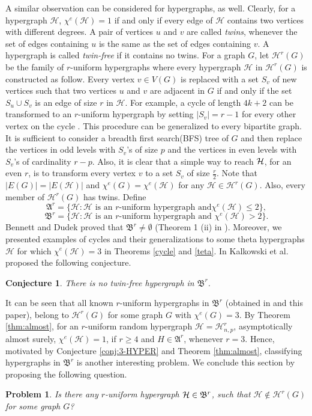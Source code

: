 \documentclass[12pt,a4paper]{article}
\newtheorem{conjecture}{\bf Conjecture}
\newtheorem{problem}[theorem]{Problem}
\begin{document}
A similar observation can be considered for hypergraphs, as well.
Clearly, for a hypergraph $ \mathcal{H} $, $ \chi^e(\mathcal{H})=1 $ if and only if every edge of $\mathcal{H}$ contains two vertices with different degrees.
A pair of vertices $ u $ and $ v $ are called \textit{twins}, whenever the set
of edges containing $ u $ is the same as the set of edges containing $ v $.
A hypergraph is called \textit{twin-free} if it contains no twins. For a graph $ G $, let $ \mathcal{H}^r(G) $ be the family of $r$-uniform  hypergraphs where every hypergraph  $\mathcal{H}$ in  $\mathcal{H}^r(G) $ is constructed  as follow. Every vertex  $v \in V( G) $ is replaced with a set $S_v$ of new vertices such that two  vertices $u$ and $v$ are adjacent in $ G $ if and only if the set $S_u \cup S_v$ is an edge of size $r$ in $\mathcal{H}$.
For example, a cycle of length $4k+2$ can be transformed  to an $r$-uniform hypergraph by setting $ |S_v|=r-1 $ for every other vertex on the cycle \cite{BDFL}.
This procedure can be generalized to every bipartite graph. It is sufficient to consider a breadth first search(BFS) tree of $G$ and then replace the vertices in odd levels with $ S_v $'s of size $p$ and   the vertices in even levels with $ S_v $'s of cardinality $r-p$. Also, it is clear that a simple way to reach $ \cal H $, for an even $ r $,  is to transform every vertex $ v $ to a set $ S_v $ of size $ \frac{r}{2} $.
Note that $|E(G)|=|E( \mathcal{H})|$ and $ \chi^{e}(G)=  \chi^{e}( \mathcal{H})$ for any $\mathcal{H}\in \mathcal{H}^r(G) $. Also, every member of $ \mathcal{H}^r(G) $ has twins.
Define
$$ \mathfrak{A}^r=\{\mathcal{H} : \mathcal{H}  \text{ is an } r\text{-uniform hypergraph and}  \chi^{e}(\mathcal{H})\leq 2 \}, $$
$$  \mathfrak{B}^r=\{\mathcal{H} : \mathcal{H}  \text{ is an } r\text{-uniform hypergraph and }  \chi^{e}(\mathcal{H})> 2 \}. $$
Bennett and Dudek proved that $  \mathfrak{B}^r \neq\emptyset $ (Theorem 1 (ii) in \cite{BDFL}). Moreover, we presented  examples of cycles and their generalizations to some theta hypergraphs $\mathcal{H}$ for  which $ \chi^e(\mathcal{H})=3 $ in Theorems \ref{cycle} and \ref{teta}.
In \cite{KKP-H} Kalkowski et al.  proposed the following conjecture.
\begin{conjecture}{\em\cite{KKP-H}}
	There is no twin-free hypergraph in  $  \mathfrak{B}^r$.
\end{conjecture}
It  can be seen that all known $r$-uniform hypergraphs in $\mathfrak{B}^r$ (obtained in  \cite{BDFL} and this paper),  belong to $\mathcal{H}^r(G) $ for some graph $G$ with $ \chi^{e}(G)=3$.
By Theorem \ref{thm:almost}, for an $ r $-uniform random hypergraph   $ \mathcal{H}= \mathcal{H}^{r}_{n,p}  $, asymptotically almost surely,  $ \chi^{e}(\mathcal{H})=1 $, if $ r\geq 4  $ and $ H\in  \mathfrak{A}^r $, whenever $ r=3 $.   Hence, motivated by Conjecture \ref{conj:3-HYPER} and Theorem \ref{thm:almost}, classifying  hypergraphs in $ \mathfrak{B}^r$ is another interesting problem. We conclude this section by proposing the following question.
\begin{problem}
	Is there any $ r$-uniform hypergraph $ {\cal H} \in {\mathfrak{B}}^r $, such that $ \mathcal{H}\notin  \mathcal{H}^r(G)$ for some graph $G$?
\end{problem}
\end{document}
